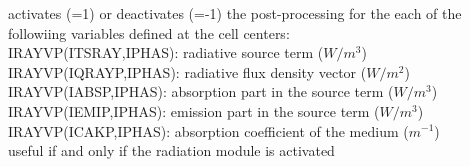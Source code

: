 {activates (=1) or deactivates (=-1) the post-processing for the each of the
followiing variables defined at the cell centers:\\
\hspace*{1.3cm} IRAYVP(ITSRAY,IPHAS): radiative source term ($W/m^3$)\\
\hspace*{1.3cm} IRAYVP(IQRAYP,IPHAS): radiative flux density vector ($W/m^2$)\\
\hspace*{1.3cm} IRAYVP(IABSP,IPHAS): absorption part in the source term
($W/m^3$)\\ 
\hspace*{1.3cm} IRAYVP(IEMIP,IPHAS): emission part in the source term
($W/m^3$)\\ 
\hspace*{1.3cm} IRAYVP(ICAKP,IPHAS): absorption coefficient of the
medium ($m^{-1}$)\\ 
useful if and only if the radiation module is activated}

